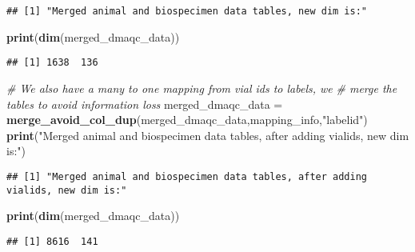 \documentclass[]{article}
\newenvironment{Shaded}{\begin{snugshade}}{\end{snugshade}}
\newcommand{\KeywordTok}[1]{\textcolor[rgb]{0.13,0.29,0.53}{\textbf{#1}}}
\newcommand{\StringTok}[1]{\textcolor[rgb]{0.31,0.60,0.02}{#1}}
\newcommand{\CommentTok}[1]{\textcolor[rgb]{0.56,0.35,0.01}{\textit{#1}}}
\newcommand{\NormalTok}[1]{#1}
\begin{document}
\begin{verbatim}
## [1] "Merged animal and biospecimen data tables, new dim is:"
\end{verbatim}

\begin{Shaded}
\begin{Highlighting}[]
\KeywordTok{print}\NormalTok{(}\KeywordTok{dim}\NormalTok{(merged_dmaqc_data))}
\end{Highlighting}
\end{Shaded}

\begin{verbatim}
## [1] 1638  136
\end{verbatim}

\begin{Shaded}
\begin{Highlighting}[]
\CommentTok{# We also have a many to one mapping from vial ids to labels, we }
\CommentTok{# merge the tables to avoid information loss}
\NormalTok{merged_dmaqc_data =}\StringTok{ }\KeywordTok{merge_avoid_col_dup}\NormalTok{(merged_dmaqc_data,mapping_info,}\StringTok{"labelid"}\NormalTok{)}
\KeywordTok{print}\NormalTok{(}\StringTok{"Merged animal and biospecimen data tables, after adding vialids, new dim is:"}\NormalTok{)}
\end{Highlighting}
\end{Shaded}

\begin{verbatim}
## [1] "Merged animal and biospecimen data tables, after adding vialids, new dim is:"
\end{verbatim}

\begin{Shaded}
\begin{Highlighting}[]
\KeywordTok{print}\NormalTok{(}\KeywordTok{dim}\NormalTok{(merged_dmaqc_data))}
\end{Highlighting}
\end{Shaded}

\begin{verbatim}
## [1] 8616  141
\end{verbatim}
\end{document}
